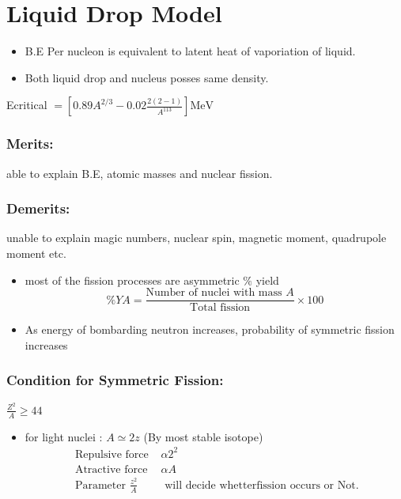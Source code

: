 \section{Liquid Drop Model}
\begin{itemize}
	\item B.E Per nucleon is equivalent to latent heat of vaporiation of liquid.
	\item  Both liquid drop and nucleus posses same density. 
\end{itemize}
Ecritical $=\left[0.89 A^{2 / 3}-0.02 \frac{2(2-1)}{A^{113}}\right] \mathrm{MeV}$
\subsubsection{Merits:}
able to explain B.E, atomic masses and nuclear fission.
\subsubsection{Demerits:} unable to explain magic numbers, nuclear spin, magnetic moment, quadrupole moment etc.
\begin{itemize}
	\item most of the fission processes are asymmetric $\%$ yield\\
	$$\%YA=\frac{\text{Number of nuclei with mass }A}{\text{Total fission}}\times 100$$
	\item As energy of bombarding neutron increases, probability of symmetric fission increases
\end{itemize}
\subsubsection{Condition for Symmetric Fission: }
$\frac{Z^{2}}{A} \geq 44 \quad $\\
\begin{itemize}
	\item for light nuclei : $A \simeq 2 z$ (By most stable isotope)
	\begin{align*}
\text{	Repulsive force }&\alpha 2^{2}\\
	\text{ Atractive force }&\alpha A\\
\text{	Parameter }\frac{z^{2}}{A}&\text{ will decide whetterfission occurs or Not.}
	\end{align*}
\end{itemize}
